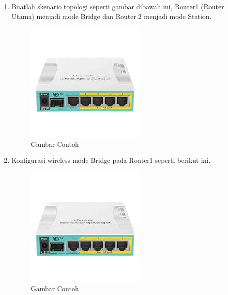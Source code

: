 \begin{center}
	\begin{enumerate}
		\item Buatlah skenario topologi seperti gambar dibawah ini, Router1 (Router Utama) menjadi mode Bridge dan Router 2 menjadi mode Station.
		\begin{figure}[H]
			\centering
			\includegraphics[width=0.7\linewidth]{P1/img/contoh.png}
			\caption{Gambar Contoh}
			\label{fig:gambarcontoh}
		\end{figure}
		\item Konfigurasi wireless mode Bridge pada Router1 seperti berikut ini.
		\begin{figure}[H]
			\centering
			\includegraphics[width=0.7\linewidth]{P1/img/contoh.png}
			\caption{Gambar Contoh}
			\label{fig:gambarcontoh}
		\end{figure}

\end{enumerate}
\end{center}
